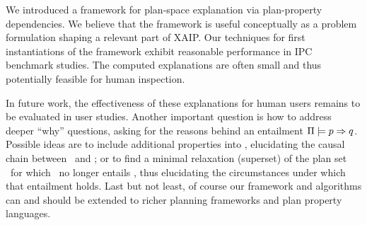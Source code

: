We introduced a framework for plan-space explanation via plan-property
dependencies. We believe that the framework is useful conceptually as
a problem formulation shaping a relevant part of XAIP. Our techniques
for first instantiations of the framework exhibit reasonable
performance in IPC benchmark studies. The computed explanations are
often small and thus potentially feasible for human inspection.



%
%
%

In future work, the effectiveness of these explanations for human
users remains to be evaluated in user studies. Another important
question is how to address deeper ``why'' questions, asking for the
reasons behind an entailment
$\Pi \models p \Rightarrow q$. Possible ideas are to include
additional properties into \props, elucidating the causal chain
between \prop\ and \propq; or to find a minimal relaxation (superset)
of the plan set \plans\ for which \prop\ no longer entails \propq,
thus elucidating the circumstances under which that entailment
holds. Last but not least, of course our framework and algorithms can
and should be extended to richer planning frameworks and plan property
languages.



